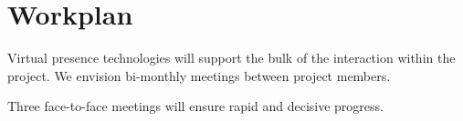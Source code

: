 
\section{Workplan}
\label{annex:work}

Virtual presence technologies will support the bulk of the interaction within the project.  We envision bi-monthly meetings between project members. 

Three face-to-face meetings will ensure rapid and decisive progress.   


